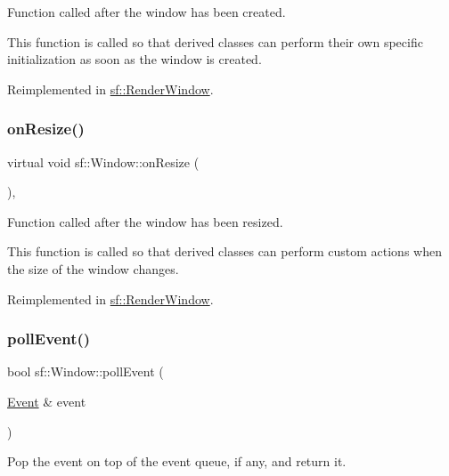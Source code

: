 Function called after the window has been created. 

This function is called so that derived classes can perform their own specific initialization as soon as the window is created. 

Reimplemented in \hyperlink{classsf_1_1_render_window_a5bef0040b0fa87bed9fbd459c980d53a}{sf\+::\+Render\+Window}.

\mbox{\label{classsf_1_1_window_a10f567a387da7b49f417f73321fcf64d}} 
\subsubsection{\texorpdfstring{on\+Resize()}{onResize()}}
{\footnotesize\ttfamily virtual void sf\+::\+Window\+::on\+Resize (\begin{DoxyParamCaption}{ }\end{DoxyParamCaption})\hspace{0.3cm}{\ttfamily [protected]}, {\ttfamily [virtual]}}



Function called after the window has been resized. 

This function is called so that derived classes can perform custom actions when the size of the window changes. 

Reimplemented in \hyperlink{classsf_1_1_render_window_a5c85fe482313562d33ffd24a194b6fef}{sf\+::\+Render\+Window}.

\mbox{\label{classsf_1_1_window_a338e996585faf82e93069858e3b531b7}} 
\subsubsection{\texorpdfstring{poll\+Event()}{pollEvent()}}
{\footnotesize\ttfamily bool sf\+::\+Window\+::poll\+Event (\begin{DoxyParamCaption}\item[{\hyperlink{classsf_1_1_event}{Event} \&}]{event }\end{DoxyParamCaption})}



Pop the event on top of the event queue, if any, and return it. 

